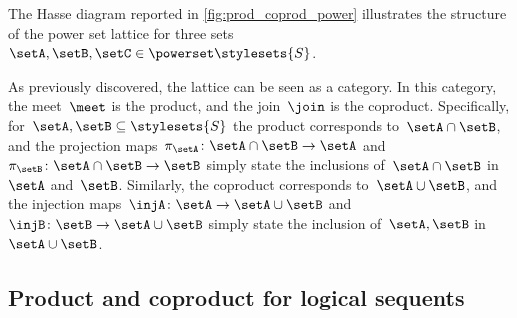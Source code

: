 The Hasse diagram reported in \cref{fig:prod_coprod_power} illustrates the structure of the power set lattice for three sets~$\setA,\setB,\setC\in \powerset \stylesets{S}$.

As previously discovered, the lattice can be seen as a category.
In this category, the meet~$\meet$ is the product, and the join~$\join$ is the coproduct.
Specifically, for~$\setA,\setB\subseteq \stylesets{S}$ the product corresponds to~$\setA\cap \setB$, and the projection maps~$\pi_\setA\colon \setA\cap \setB\to \setA$ and~$\pi_\setB\colon \setA\cap \setB\to \setB$ simply state the inclusions of~$\setA\cap \setB$ in~$\setA$ and~$\setB$.
Similarly, the coproduct corresponds to~$\setA\cup \setB$, and the injection maps~$\injA\colon \setA\to \setA\cup \setB$ and~$\injB\colon \setB\to \setA\cup \setB$ simply state the inclusion of~$\setA,\setB$ in~$\setA\cup \setB$.

\subsection{Product and coproduct for logical sequents}
\publictodomessage

